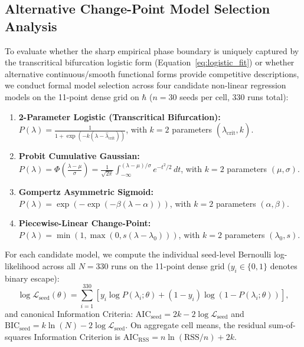 \documentclass{article}
\theoremstyle{plain}
\theoremstyle{definition}
\begin{document}
\subsection{Alternative Change-Point Model Selection Analysis}
\label{sec:app_model_selection}
To evaluate whether the sharp empirical phase boundary is uniquely captured by the transcritical bifurcation logistic form (Equation~\eqref{eq:logistic_fit}) or whether alternative continuous/smooth functional forms provide competitive descriptions, we conduct formal model selection across four candidate non-linear regression models on the 11-point dense grid on $\hbar$ ($n=30$ seeds per cell, 330 runs total):
\begin{enumerate}[leftmargin=*,noitemsep]
    \item \textbf{2-Parameter Logistic (Transcritical Bifurcation):} $P(\lambda) = \frac{1}{1 + \exp(-k(\lambda - \hat{\lambda}_{\text{crit}}))}$, with $k=2$ parameters $(\hat{\lambda}_{\text{crit}}, k)$.
    \item \textbf{Probit Cumulative Gaussian:} $P(\lambda) = \Phi\left(\frac{\lambda - \mu}{\sigma}\right) = \frac{1}{\sqrt{2\pi}} \int_{-\infty}^{(\lambda - \mu)/\sigma} e^{-t^2/2} \, dt$, with $k=2$ parameters $(\mu, \sigma)$.
    \item \textbf{Gompertz Asymmetric Sigmoid:} $P(\lambda) = \exp\left(-\exp(-\beta(\lambda - \alpha))\right)$, with $k=2$ parameters $(\alpha, \beta)$.
    \item \textbf{Piecewise-Linear Change-Point:} $P(\lambda) = \min\left(1, \max\left(0, s(\lambda - \lambda_0)\right)\right)$, with $k=2$ parameters $(\lambda_0, s)$.
\end{enumerate}
For each candidate model, we compute the individual seed-level Bernoulli log-likelihood across all $N=330$ runs on the 11-point dense grid ($y_i \in \{0, 1\}$ denotes binary escape):
\begin{equation}
    \log \mathcal{L}_{\text{seed}}(\theta) = \sum_{i=1}^{330} \left[ y_i \log P(\lambda_i; \theta) + (1 - y_i) \log (1 - P(\lambda_i; \theta)) \right],
\end{equation}
and canonical Information Criteria: $\text{AIC}_{\text{seed}} = 2k - 2 \log \mathcal{L}_{\text{seed}}$ and $\text{BIC}_{\text{seed}} = k \ln(N) - 2 \log \mathcal{L}_{\text{seed}}$. On aggregate cell means, the residual sum-of-squares Information Criterion is $\text{AIC}_{\text{RSS}} = n \ln(\text{RSS}/n) + 2k$.
\end{document}

